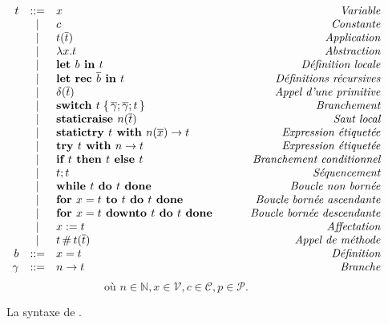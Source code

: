 \begin{figure}

\[
\begin{array}{rclr}
t
  & ::= & x & \qquad\textit{Variable} \\
  & |   & c & \qquad\textit{Constante} \\
  & |   & t (\overline{t}) & \qquad\textit{Application} \\
  & |   & \lambda x. t & \qquad\textit{Abstraction} \\
  & |   & \textbf{let }b \textbf{ in } t & \qquad\textit{Définition locale} \\
  & |   & \textbf{let rec }\overline{b} \textbf{ in } t & \qquad\textit{Définitions récursives} \\
  & |   & \delta (\overline{t}) & \qquad\textit{Appel d'une primitive} \\
  & |   & \textbf{switch } t \;\{\, \overline{\gamma}; \overline{\gamma}; t \,\}
        & \qquad\textit{Branchement} \\
  & |   & \textbf{staticraise } n (\overline{t}) & \qquad\textit{Saut local} \\
  & |   & \textbf{statictry } t \textbf{ with } n (\overline{x}) \rightarrow t & \qquad\textit{Expression étiquetée} \\
  & |   & \textbf{try } t \textbf{ with } n \rightarrow t & \qquad\textit{Expression étiquetée} \\
  & |   & \textbf{if } t \textbf{ then } t \textbf{ else } t & \qquad\textit{Branchement conditionnel} \\
  & |   & t ; t & \qquad\textit{Séquencement} \\
  & |   & \textbf{while } t \textbf{ do } t \textbf{ done } & \qquad\textit{Boucle non bornée} \\
  & |   & \textbf{for } x = t \textbf{ to } t \textbf{ do } t \textbf{ done } & \qquad\textit{Boucle bornée ascendante} \\
  & |   & \textbf{for } x = t \textbf{ downto } t \textbf{ do } t \textbf{ done } & \qquad\textit{Boucle bornée descendante} \\
  & |   & x := t & \qquad\textit{Affectation} \\
  & |   & t \,\#\, t (\overline{t}) & \qquad\textit{Appel de méthode} \\
b & ::= & x = t & \qquad\textit{Définition} \\
\gamma  & ::= & n \rightarrow t & \qquad\textit{Branche} \\
\end{array}
\]
\[
\textrm{où }
n \in \mathbb{N},
x \in \mathcal{V},
c \in \mathcal{C},
p \in \mathcal{P}.
\]

\caption{La syntaxe de {\LambdaCode}.}
\label{fig:lambda-syntax}
\end{figure}
